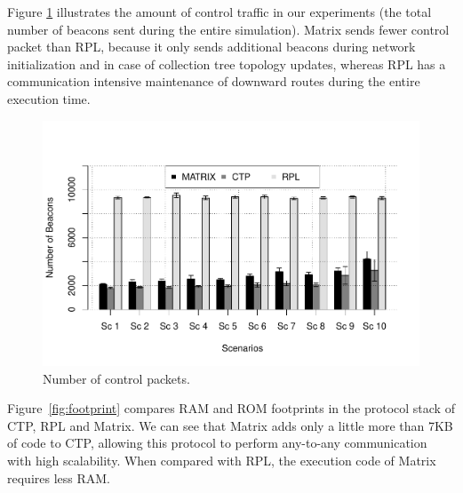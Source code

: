 Figure \ref{fig:beacons} illustrates the amount of control traffic
in our experiments (the total number of beacons sent during the entire
simulation).
Matrix sends fewer control packet than RPL, because it
only sends additional beacons during network initialization and in
case of collection tree topology updates, whereas RPL has a communication
intensive maintenance of downward routes during the entire execution time. 

\begin{figure}[h]
    \centering
    \includegraphics[width=1\linewidth]{Images/beacons.pdf}
    \caption{Number of control packets.}
    \label{fig:beacons}
\end{figure}

Figure~\ref{fig:footprint} compares RAM and ROM footprints in
the protocol stack of CTP, RPL and Matrix. We can see that Matrix adds only a
little more than 7KB of code to CTP, allowing this protocol to perform any-to-any communication with
high scalability. When compared with RPL, the execution code of
Matrix requires less RAM. %

